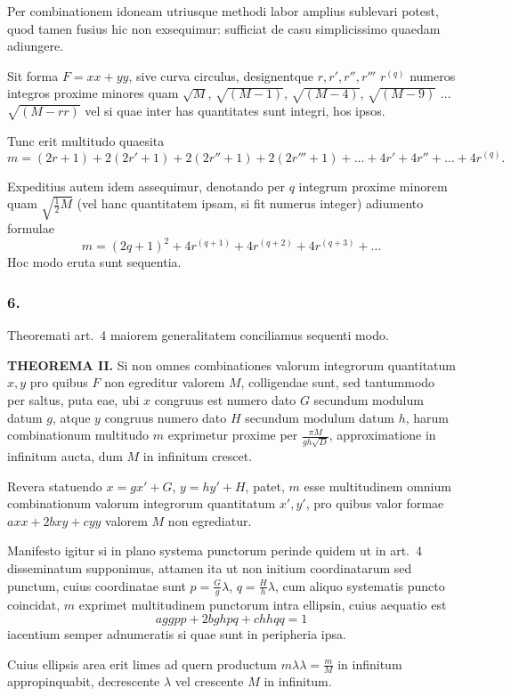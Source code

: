 \documentclass[12pt,a4paper]{article}
\begin{document}
Per combinationem idoneam utriusque methodi labor amplius sublevari potest, quod tamen fusius hic non exsequimur: sufficiat de casu simplicissimo quaedam adiungere.

Sit forma $F=xx+yy$, sive curva circulus, designentque $r, r', r'', r'''$ $r^{(q)}$ numeros integros proxime minores quam $\sqrt{M}$, $\sqrt{(M-1)}$, $\sqrt{(M-4)}$, $\sqrt{(M-9)}$ $\ldots$ $\sqrt{(M-rr)}$ vel si quae inter has quantitates sunt integri, hos ipsos.

Tunc erit multitudo quaesita
\[
m = (2r+1) + 2(2r'+1) + 2(2r''+1) + 2(2r'''+1) + \ldots + 4r' + 4r'' + \ldots + 4r^{(q)}.
\]

Expeditius autem idem assequimur, denotando per $q$ integrum proxime minorem quam $\sqrt{\frac{1}{2}M}$ (vel hanc quantitatem ipsam, si fit numerus integer) adiumento formulae
\[
m = (2q+1)^2 + 4r^{(q+1)} + 4r^{(q+2)} + 4r^{(q+3)} + \ldots
\]
Hoc modo eruta sunt sequentia.

\subsubsection*{6.}

Theoremati art.\ 4 maiorem generalitatem conciliamus sequenti modo.

\textbf{THEOREMA II.} Si non omnes combinationes valorum integrorum quantitatum $x, y$ pro quibus $F$ non egreditur valorem $M$, colligendae sunt, sed tantummodo per saltus, puta eae, ubi $x$ congruus est numero dato $G$ secundum modulum datum $g$, atque $y$ congruus numero dato $H$ secundum modulum datum $h$, harum combinationum multitudo $m$ exprimetur proxime per $\frac{\pi M}{gh\sqrt{D}}$, approximatione in infinitum aucta, dum $M$ in infinitum crescet.

Revera statuendo $x=gx'+G$, $y=hy'+H$, patet, $m$ esse multitudinem omnium combinationum valorum integrorum quantitatum $x', y'$, pro quibus valor formae $axx+2bxy+cyy$ valorem $M$ non egrediatur.

Manifesto igitur si in plano systema punctorum perinde quidem ut in art.\ 4 disseminatum supponimus, attamen ita ut non initium coordinatarum sed punctum, cuius coordinatae sunt $p=\frac{G}{g}\lambda$, $q=\frac{H}{h}\lambda$, cum aliquo systematis puncto coincidat, $m$ exprimet multitudinem punctorum intra ellipsin, cuius aequatio est
\[
aggpp + 2bghpq + chhqq = 1
\]
iacentium semper adnumeratis si quae sunt in peripheria ipsa.

Cuius ellipsis area erit limes ad quern productum $m\lambda\lambda = \frac{m}{M}$ in infinitum appropinquabit, decrescente $\lambda$ vel crescente $M$ in infinitum.
\end{document}
